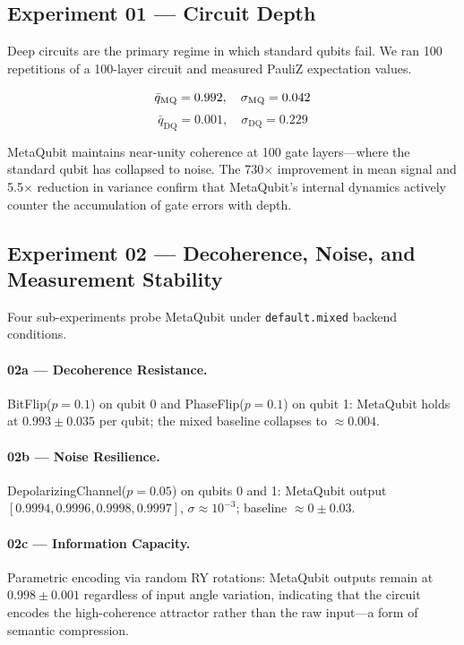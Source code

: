 \documentclass[twocolumn,amsmath,amssymb,prl]{revtex4-2}
\begin{document}
\subsection{Experiment 01 — Circuit Depth}

Deep circuits are the primary regime in which standard qubits fail.  We ran 100
repetitions of a 100-layer circuit and measured PauliZ expectation values.

\begin{equation}
  \bar{q}_{\mathrm{MQ}} = 0.992, \quad \sigma_{\mathrm{MQ}} = 0.042 \\
\end{equation}
\begin{equation}
  \bar{q}_{\mathrm{DQ}} = 0.001, \quad \sigma_{\mathrm{DQ}} = 0.229
\end{equation}

MetaQubit maintains near-unity coherence at 100 gate layers—where the
standard qubit has collapsed to noise.  The 730$\times$ improvement in mean
signal and 5.5$\times$ reduction in variance confirm that MetaQubit's internal
dynamics actively counter the accumulation of gate errors with depth.

\subsection{Experiment 02 — Decoherence, Noise, and Measurement Stability}

Four sub-experiments probe MetaQubit under \texttt{default.mixed} backend
conditions.

\paragraph{02a — Decoherence Resistance.}
BitFlip($p = 0.1$) on qubit 0 and PhaseFlip($p = 0.1$) on qubit 1:
MetaQubit holds at $0.993 \pm 0.035$ per qubit; the mixed baseline collapses
to $\approx 0.004$.

\paragraph{02b — Noise Resilience.}
DepolarizingChannel($p = 0.05$) on qubits 0 and 1:
MetaQubit output $[0.9994, 0.9996, 0.9998, 0.9997]$,
$\sigma \approx 10^{-3}$;
baseline $\approx 0 \pm 0.03$.

\paragraph{02c — Information Capacity.}
Parametric encoding via random RY rotations:
MetaQubit outputs remain at $0.998 \pm 0.001$ regardless of input angle
variation, indicating that the circuit encodes the high-coherence attractor
rather than the raw input—a form of semantic compression.
\end{document}
